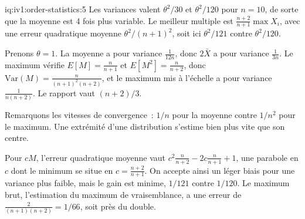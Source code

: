 \begin{solution}{iq:iv1:order-statistics:5}
Les variances valent $\theta^2/30$ et $\theta^2/120$ pour $n = 10$, de sorte que la moyenne est 4 fois plus variable. Le meilleur multiple est $\frac{n + 2}{n + 1}\max X_i$, avec une erreur quadratique moyenne $\theta^2/(n + 1)^2$, soit ici $\theta^2/121$ contre $\theta^2/120$.

Prenons $\theta = 1$. La moyenne a pour variance $\frac{1}{12n}$, donc $2\bar{X}$ a pour variance $\frac{1}{3n}$. Le maximum vérifie $E[M] = \frac{n}{n + 1}$ et $E[M^2] = \frac{n}{n + 2}$, donc $\mathrm{Var}(M) = \frac{n}{(n + 1)^2(n + 2)}$, et le maximum mis à l'échelle a pour variance $\frac{1}{n(n + 2)}$. Le rapport vaut $(n + 2)/3$.

Remarquons les vitesses de convergence~: $1/n$ pour la moyenne contre $1/n^2$ pour le maximum. Une extrémité d'une distribution s'estime bien plus vite que son centre.

Pour $cM$, l'erreur quadratique moyenne vaut $c^2 \frac{n}{n + 2} - 2c \frac{n}{n + 1} + 1$, une parabole en $c$ dont le minimum se situe en $c = \frac{n + 2}{n + 1}$. On accepte ainsi un léger biais pour une variance plus faible, mais le gain est minime, $1/121$ contre $1/120$. Le maximum brut, l'estimation du maximum de vraisemblance, a une erreur de $\frac{2}{(n + 1)(n + 2)} = 1/66$, soit près du double.

\end{solution}

